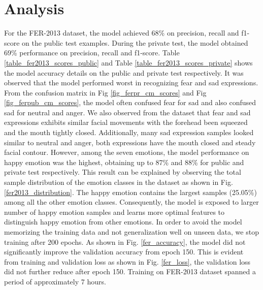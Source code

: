 \documentclass[master]{thesis-uestc}
\begin{document}
\section{Analysis}
For the FER-2013 dataset, the model achieved 68\% on precision, recall and f1-score on the public test examples. During the private test, the model obtained 69\% performance on precision, recall and f1-score. Table \ref{table_fer2013_scores_public} and Table \ref{table_fer2013_scores_private} shows the model accuracy details on the public and private test respectively. It was observed that the model performed worst in recognizing fear and sad expressions. From the confusion matrix in Fig \ref{fig_ferpr_cm_scores} and Fig \ref{fig_ferpub_cm_scores}, the model often confused fear for sad and also confused sad for neutral and anger. We also observed from the dataset that fear and sad expressions exhibits similar facial movements with the forehead been squeezed and the mouth tightly closed. Additionally, many sad expression samples looked similar to neutral and anger, both expressions have the mouth closed and steady facial contour. However, among the seven emotions, the model performance on happy emotion was the highest, obtaining up to 87\% and 88\% for public and private test respectively. This result can be explained by observing the total sample distribution of the emotion classes in the dataset as shown in Fig. \ref{fer2013_distribution}. The happy emotion contains the largest samples (25.05\%) among all the other emotion classes. Consequently, the model is exposed to larger number of happy emotion samples and learns more optimal features to distinguish happy emotion from other emotions. In order to avoid the model memorizing the training data and not generalization well on unseen data, we stop training after 200 epochs. As shown in Fig. \ref{fer_accuracy}, the model did not significantly improve the validation accuracy from epoch 150. This is evident from training and validation loss as shown in Fig. \ref{fer_loss}, the validation loss did not further reduce after epoch 150. Training on FER-2013 dataset spanned a period of approximately 7 hours.
\end{document}
